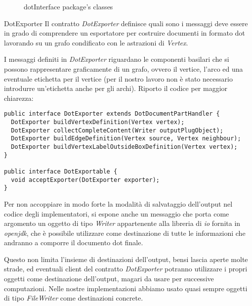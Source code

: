 \begin{figure}
  \centering
  \caption{dotInterface package's classes}
  \label{fig:dot-interface-package-classes}
\end{figure}

\begin{paragraph}{DotExporter}
  Il contratto \emph{DotExporter} definisce quali sono i messaggi deve
  essere in grado di comprendere un esportatore per costruire
  documenti in formato dot lavorando su un grafo condificato con le
  astrazioni di \emph{Vertex}.

  I messaggi definiti in \emph{DotExporter} riguardano le componenti
  basilari che si possono rappresentare graficamente di un grafo,
  ovvero il vertice, l'arco ed una eventuale etichetta per il vertice
  (per il nostro lavoro non \`e stato necessario introdurre
  un'etichetta anche per gli archi). Riporto il codice per maggior
  chiarezza:
  \begin{lstlisting}
public interface DotExporter extends DotDocumentPartHandler {
  DotExporter buildVertexDefinition(Vertex vertex);
  DotExporter collectCompleteContent(Writer outputPlugObject);
  DotExporter buildEdgeDefinition(Vertex source, Vertex neighbour);
  DotExporter buildVertexLabelOutsideBoxDefinition(Vertex vertex);
}

public interface DotExportable {
  void acceptExporter(DotExporter exporter);
}

  \end{lstlisting}

  Per non accoppiare in modo forte la modalit\`a di salvataggio
  dell'output nel codice degli implementatori, si espone anche un
  messaggio che porta come argomento un oggetto di tipo \emph{Writer}
  appartenente alla libreria di \emph{io} fornita in \emph{openjdk},
  che \`e possibile utilizzare come destinazione di tutte le
  informazioni che andranno a comporre il documento dot finale. 

  Questo non limita l'insieme di destinazioni dell'output, bensi
  lascia aperte molte strade, ed eventuali client del contratto
  \emph{DotExporter} potranno utilizzare i propri oggetti come
  destinazione dell'output, magari da usare per successive
  computazioni. Nelle nostre implementazioni abbiamo usato quasi
  sempre oggetti di tipo \emph{FileWriter} come destinazioni concrete.
\end{paragraph}


